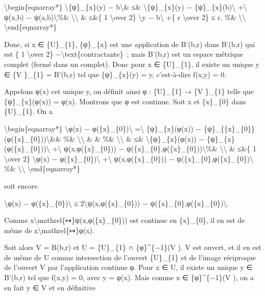 \documentclass[]{article}
\begin{document}
\textbackslash{}begin\{eqnarray*\}
\textbackslash{}\textbar{}\{ψ\}\_\{x\}(y) −
b\textbackslash{}\textbar{}\& ≤\&
\textbackslash{}\textbar{}\{ψ\}\_\{x\}(y) −
\{ψ\}\_\{x\}(b)\textbackslash{}\textbar{} +\textbackslash{}\textbar{}
ψ(x,b) − ψ(a,b)\textbackslash{}\textbar{}\%\&
\textbackslash{}\textbackslash{} \& ≤\&\{ 1 \textbackslash{}over 2\}
\textbackslash{}\textbar{}y − b\textbackslash{}\textbar{} +\{ r
\textbackslash{}over 2\} ≤ r. \%\& \textbackslash{}\textbackslash{}
\textbackslash{}end\{eqnarray*\}

Donc, si x ∈ \{U\}\_\{1\}, \{ψ\}\_\{x\} est une application de B'(b,r)
dans B'(b,r) qui est \{ 1 \textbackslash{}over 2\}
−\textbackslash{}text\{contractante\}~; mais B'(b,r) est un espace
métrique complet (fermé dans un complet). Donc pour x ∈ \{U\}\_\{1\}, il
existe un unique y ∈ \{V \}\_\{1\} = B'(b,r) tel que \{ψ\}\_\{x\}(y) =
y, c'est-à-dire f(x,y) = 0.

Appelons φ(x) cet unique y, on définit ainsi φ : \{U\}\_\{1\} → \{V
\}\_\{1\} telle que \{ψ\}\_\{x\}(φ(x)) = φ(x). Montrons que φ est
continue. Soit x et \{x\}\_\{0\} dans \{U\}\_\{1\}. On a

\textbackslash{}begin\{eqnarray*\} \textbackslash{}\textbar{}φ(x) −
φ(\{x\}\_\{0\})\textbackslash{}\textbar{} =\textbackslash{}\textbar{}
\{ψ\}\_\{x\}(φ(x)) −
\{ψ\}\_\{\{x\}\_\{0\}\}(φ(\{x\}\_\{0\}))\textbackslash{}\textbar{}\&\&
\%\& \textbackslash{}\textbackslash{} \& \& \%\&
\textbackslash{}\textbackslash{} \& ≤\&
\textbackslash{}\textbar{}\{ψ\}\_\{x\}(φ(x)) −
\{ψ\}\_\{x\}(φ(\{x\}\_\{0\}))\textbackslash{}\textbar{}
+\textbackslash{}\textbar{} ψ(x,φ(\{x\}\_\{0\})) −
ψ(\{x\}\_\{0\},φ(\{x\}\_\{0\}))\textbackslash{}\textbar{}\%\&
\textbackslash{}\textbackslash{} \& ≤\&\{ 1 \textbackslash{}over 2\}
\textbackslash{}\textbar{}φ(x) −
φ(\{x\}\_\{0\})\textbackslash{}\textbar{} +\textbackslash{}\textbar{}
ψ(x,φ(\{x\}\_\{0\})) −
ψ(\{x\}\_\{0\},φ(\{x\}\_\{0\})\textbackslash{}\textbar{} \%\&
\textbackslash{}\textbackslash{} \textbackslash{}end\{eqnarray*\}

soit encore

\textbackslash{}\textbar{}φ(x) −
φ(\{x\}\_\{0\})\textbackslash{}\textbar{} ≤
2\textbackslash{}\textbar{}ψ(x,φ(\{x\}\_\{0\})) −
ψ(\{x\}\_\{0\},φ(\{x\}\_\{0\})\textbackslash{}\textbar{}.

Comme x\textbackslash{}mathrel\{↦\}ψ(x,φ(\{x\}\_\{0\})) est continue en
\{x\}\_\{0\}, il en est de même de x\textbackslash{}mathrel\{↦\}φ(x).

Soit alors V = B(b,r) et U = \{U\}\_\{1\} ∩ \{φ\}\^{}\{−1\}(V ). V est
ouvert, et il en est de même de U comme intersection de l'ouvert
\{U\}\_\{1\} et de l'image réciproque de l'ouvert V par l'application
continue φ. Pour x ∈ U, il existe un unique y ∈ B'(b,r) tel que f(x,y) =
0, avec y = φ(x). Mais comme x ∈ \{φ\}\^{}\{−1\}(V ), on a en fait y ∈ V
et en définitive
\end{document}
